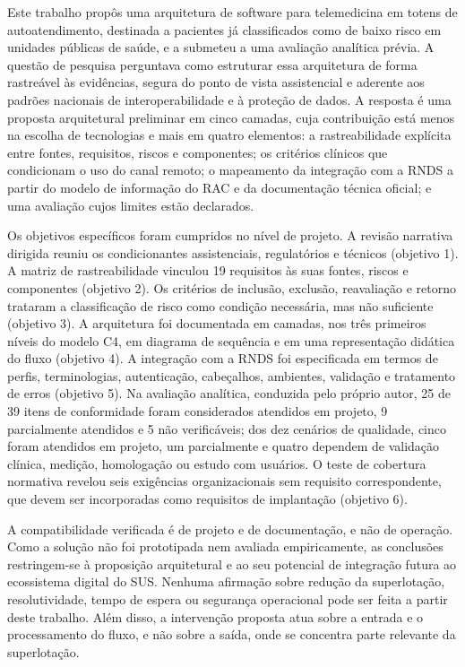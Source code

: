\label{sec:conclusao}

Este trabalho propôs uma arquitetura de software para telemedicina em totens de autoatendimento, destinada a pacientes já classificados como de baixo risco em unidades públicas de saúde, e a submeteu a uma avaliação analítica prévia. A questão de pesquisa perguntava como estruturar essa arquitetura de forma rastreável às evidências, segura do ponto de vista assistencial e aderente aos padrões nacionais de interoperabilidade e à proteção de dados. A resposta é uma proposta arquitetural preliminar em cinco camadas, cuja contribuição está menos na escolha de tecnologias e mais em quatro elementos: a rastreabilidade explícita entre fontes, requisitos, riscos e componentes; os critérios clínicos que condicionam o uso do canal remoto; o mapeamento da integração com a RNDS a partir do modelo de informação do RAC e da documentação técnica oficial; e uma avaliação cujos limites estão declarados.

Os objetivos específicos foram cumpridos no nível de projeto. A revisão narrativa dirigida reuniu os condicionantes assistenciais, regulatórios e técnicos (objetivo 1). A matriz de rastreabilidade vinculou 19 requisitos às suas fontes, riscos e componentes (objetivo 2). Os critérios de inclusão, exclusão, reavaliação e retorno trataram a classificação de risco como condição necessária, mas não suficiente (objetivo 3). A arquitetura foi documentada em camadas, nos três primeiros níveis do modelo C4, em diagrama de sequência e em uma representação didática do fluxo (objetivo 4). A integração com a RNDS foi especificada em termos de perfis, terminologias, autenticação, cabeçalhos, ambientes, validação e tratamento de erros (objetivo 5). Na avaliação analítica, conduzida pelo próprio autor, 25 de 39 itens de conformidade foram considerados atendidos em projeto, 9 parcialmente atendidos e 5 não verificáveis; dos dez cenários de qualidade, cinco foram atendidos em projeto, um parcialmente e quatro dependem de validação clínica, medição, homologação ou estudo com usuários. O teste de cobertura normativa revelou seis exigências organizacionais sem requisito correspondente, que devem ser incorporadas como requisitos de implantação (objetivo 6).

A compatibilidade verificada é de projeto e de documentação, e não de operação. Como a solução não foi prototipada nem avaliada empiricamente, as conclusões restringem-se à proposição arquitetural e ao seu potencial de integração futura ao ecossistema digital do SUS. Nenhuma afirmação sobre redução da superlotação, resolutividade, tempo de espera ou segurança operacional pode ser feita a partir deste trabalho. Além disso, a intervenção proposta atua sobre a entrada e o processamento do fluxo, e não sobre a saída, onde se concentra parte relevante da superlotação.

